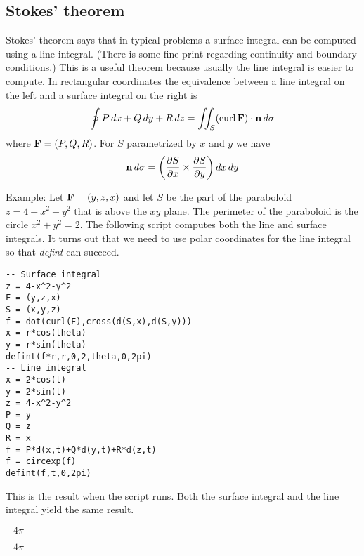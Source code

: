 \subsection{Stokes' theorem}

Stokes' theorem says that in typical problems a surface integral can be
computed using a line integral.
(There is some fine print regarding continuity and boundary conditions.)
This is a useful theorem because usually the line integral is easier to
compute.
In rectangular coordinates the equivalence between a line integral
on the left and a surface integral on the right is
%
$$\oint P\,dx+Q\,dy+R\,dz
=\int\!\!\!\int_S(\mathop{\rm curl}{\bf F})\cdot{\bf n}\,d\sigma
$$
%
where ${\bf F}=(P,Q,R)$.
For $S$ parametrized by $x$ and $y$ we have
$${\bf n}\,d\sigma=\left(
{\partial S\over\partial x}\times{\partial S\over\partial y}
\right)dx\,dy$$

\noindent
Example:
Let ${\bf F}=(y,z,x)$ and let $S$ be the part of the paraboloid
$z=4-x^2-y^2$
that is above the $xy$ plane.
The perimeter of the paraboloid is the circle $x^2+y^2=2$.
The following script computes both the line and surface integrals.
It turns out that we need to use polar coordinates for the
line integral so that {\it defint} can succeed.

\begin{Verbatim}[formatcom=\color{blue},samepage=true]
-- Surface integral
z = 4-x^2-y^2
F = (y,z,x)
S = (x,y,z)
f = dot(curl(F),cross(d(S,x),d(S,y)))
x = r*cos(theta)
y = r*sin(theta)
defint(f*r,r,0,2,theta,0,2pi)
-- Line integral
x = 2*cos(t)
y = 2*sin(t)
z = 4-x^2-y^2
P = y
Q = z
R = x
f = P*d(x,t)+Q*d(y,t)+R*d(z,t)
f = circexp(f)
defint(f,t,0,2pi)
\end{Verbatim}

\noindent
This is the result when the script runs.
Both the surface integral and the line integral
yield the same result.

\bigskip
\noindent
$\displaystyle -4\pi$

\bigskip
\noindent
$\displaystyle -4\pi$
